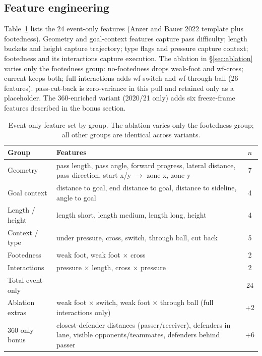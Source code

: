 \documentclass[11pt,a4paper]{article}
\begin{document}
\subsection{Feature engineering}
Table~\ref{tab:feats} lists the 24 event-only features (Anzer and Bauer 2022 template plus footedness). Geometry and goal-context features capture pass difficulty; length buckets and height capture trajectory; type flags and pressure capture context; footedness and its interactions capture execution. The ablation in \S\ref{sec:ablation} varies only the footedness group: no-footedness drops weak-foot and wf-cross; current keeps both; full-interactions adds wf-switch and wf-through-ball (26 features). pass-cut-back is zero-variance in this pull and retained only as a placeholder. The 360-enriched variant (2020/21 only) adds six freeze-frame features described in the bonus section.
\begin{table}[h]
\centering
\small
\begin{tabular}{lp{9cm}c}
\toprule
Group & Features & $n$ \\
\midrule
Geometry & pass length, pass angle, forward progress, lateral distance, pass direction, start x/y $\rightarrow$ zone x, zone y & 7 \\
Goal context & distance to goal, end distance to goal, distance to sideline, angle to goal & 4 \\
Length / height & length short, length medium, length long, height & 4 \\
Context / type & under pressure, cross, switch, through ball, cut back & 5 \\
Footedness & weak foot, weak foot $\times$ cross & 2 \\
Interactions & pressure $\times$ length, cross $\times$ pressure & 2 \\
\midrule
Total event-only & & 24 \\
Ablation extras & weak foot $\times$ switch, weak foot $\times$ through ball (full interactions only) & +2 \\
360-only bonus & closest-defender distances (passer/receiver), defenders in lane, visible opponents/teammates, defenders behind passer & +6 \\
\bottomrule
\end{tabular}
\caption{Event-only feature set by group. The ablation varies only the footedness group; all other groups are identical across variants.}
\label{tab:feats}
\end{table}
\end{document}
